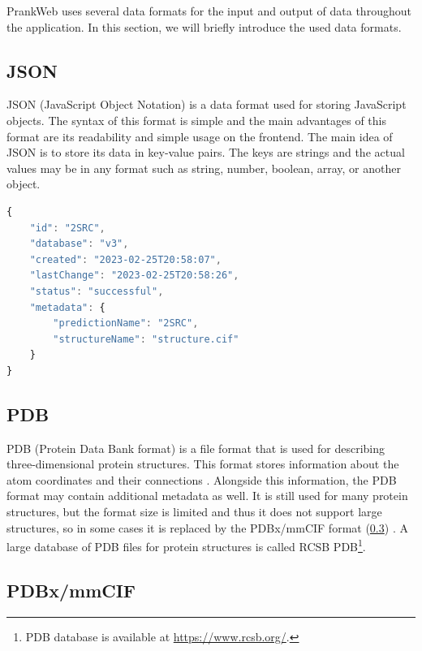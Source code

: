 PrankWeb uses several data formats for the input and output of data throughout the application. In this section, we will briefly introduce the used data formats.

\subsection{JSON}
\label{subsec:json}

JSON (JavaScript Object Notation) is a data format used for storing JavaScript objects. The syntax of this format is simple and the main advantages of this format are its readability and simple usage on the frontend. The main idea of JSON is to store its data in key-value pairs. The keys are strings and the actual values may be in any format such as string, number, boolean, array, or another object.

\begin{lstlisting}[language=JavaScript,caption={
    An example of a JSON file used for storing information about the prediction for the 2SRC protein structure.
}]
{
    "id": "2SRC",
    "database": "v3",
    "created": "2023-02-25T20:58:07",
    "lastChange": "2023-02-25T20:58:26",
    "status": "successful",
    "metadata": {
        "predictionName": "2SRC",
        "structureName": "structure.cif"
    }
}
\end{lstlisting}


\subsection{PDB}
\label{subsec:PDB}

PDB (Protein Data Bank format) is a file format that is used for describing three-dimensional protein structures. This format stores information about the atom coordinates and their connections \cite{bernstein1977protein}. Alongside this information, the PDB format may contain additional metadata as well. It is still used for many protein structures, but the format size is limited and thus it does not support large structures, so in some cases it is replaced by the PDBx/mmCIF format (\cref{subsec:PDBx_mmCIF}) \cite{adams2019announcing}. A large database of PDB files for protein structures is called RCSB PDB\footnote{PDB database is available at \url{https://www.rcsb.org/}.}.




\subsection{PDBx/mmCIF}
\label{subsec:PDBx_mmCIF}

